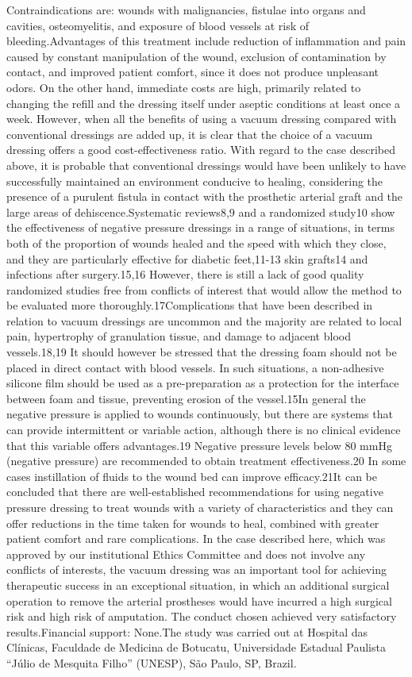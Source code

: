 \documentclass[numberinsection,times,10pt,spreadimages]{memoir}
\begin{document}
Contraindications are: wounds with malignancies, fistulae into organs and
cavities, osteomyelitis, and exposure of blood vessels at risk of
bleeding.Advantages of this treatment include reduction of inflammation and pain
caused by
constant manipulation of the wound, exclusion of contamination by contact, and
improved patient comfort, since it does not produce unpleasant odors. On the
other hand, immediate costs are high, primarily related to changing the refill
and the dressing itself under aseptic conditions at least once a week. However,
when all the benefits of using a vacuum dressing compared with conventional
dressings are added up, it is clear that the choice of a vacuum dressing offers
a good cost-effectiveness ratio. With regard to the case described above, it is
probable that conventional dressings would have been unlikely to have
successfully maintained an environment conducive to healing, considering the
presence of a purulent fistula in contact with the prosthetic arterial graft and
the large areas of dehiscence.Systematic reviews8,9 and a randomized study10
show the effectiveness of negative pressure
dressings in a range of situations, in terms both of the proportion of wounds
healed and the speed with which they close, and they are particularly effective
for diabetic feet,11-13 skin grafts14 and infections after surgery.15,16
However, there is still a lack of good quality
randomized studies free from conflicts of interest that would allow the method
to be evaluated more thoroughly.17Complications that have been described in
relation to vacuum dressings are
uncommon and the majority are related to local pain, hypertrophy of granulation
tissue, and damage to adjacent blood vessels.18,19 It should however be stressed
that the dressing
foam should not be placed in direct contact with blood vessels. In such
situations, a non-adhesive silicone film should be used as a pre-preparation as
a protection for the interface between foam and tissue, preventing erosion of
the vessel.15In general the negative pressure is applied to wounds continuously,
but there are
systems that can provide intermittent or variable action, although there is no
clinical evidence that this variable offers advantages.19 Negative pressure
levels below 80 mmHg
(negative pressure) are recommended to obtain treatment effectiveness.20 In some
cases instillation
of fluids to the wound bed can improve efficacy.21It can be concluded that there
are well-established recommendations for using
negative pressure dressing to treat wounds with a variety of characteristics and
they can offer reductions in the time taken for wounds to heal, combined with
greater patient comfort and rare complications. In the case described here,
which was approved by our institutional Ethics Committee and does not involve
any conflicts of interests, the vacuum dressing was an important tool for
achieving therapeutic success in an exceptional situation, in which an
additional surgical operation to remove the arterial prostheses would have
incurred a high surgical risk and high risk of amputation. The conduct chosen
achieved very satisfactory results.Financial support: None.The study was carried
out at Hospital das Clínicas, Faculdade de Medicina de
Botucatu, Universidade Estadual Paulista “Júlio de Mesquita Filho” (UNESP),
São Paulo, SP, Brazil.

% 
\end{document}
